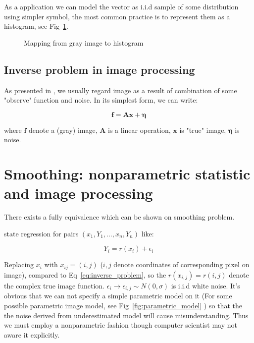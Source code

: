 \documentclass{article}
\begin{document}
As a application we can model the vector as i.i.d sample of some distribution using simpler symbol, the most 
common practice is to represent them as a histogram, see Fig~\ref{fig:map_gray_to_hist}.

\begin{figure}[htb]
  \centering
  
  \caption{Mapping from gray image to histogram}
  \label{fig:map_gray_to_hist}
\end{figure}

\subsection{Inverse problem in image processing}

As presented in \cite{dong2015image}, we usually regard image as a result of combination of some "observe"
function and noise. In its simplest form, we can write:

\begin{equation}
\mathbf{f} = \mathbf{A} \mathbf{x} + \mathbf{\eta}
\label{eq:inverse_problem}
\end{equation}

where $\mathbf{f}$ denote a (gray) image, $\mathbf{A}$ is a linear operation, $\mathbf{x}$ is "true" image,
$\mathbf{\eta}$ is noise.
 
\section{Smoothing: nonparametric statistic and image processing}

There exists a fully equivalence which can be shown on smoothing problem.

\cite{wasserman2006all} state regression for pairs $(x_1,Y_1,\dots,x_n,Y_n)$ like:

$$
Y_i = r(x_i) + \epsilon_i
$$

Replacing $x_i$ with $x_{ij}=(i,j)$ ($i,j$ denote coordinates of corresponding pixel on image), compared to Eq~\ref{eq:inverse_problem},
so the $r(x_{i,j})=r(i,j)$ denote the complex true image function. $\epsilon_i \to \epsilon_{i,j} \sim N(0,\sigma)$ is i.i.d white noise.
It's obvious that we can not specify a simple parametric model on it (For some possible parametric image model,
see Fig~\ref{fig:parametric_model} ) so that the the noise derived from underestimated model will cause misunderstanding. 
Thus we must employ a nonparametric fashion though computer scientist may not aware it explicitly.
\end{document}
